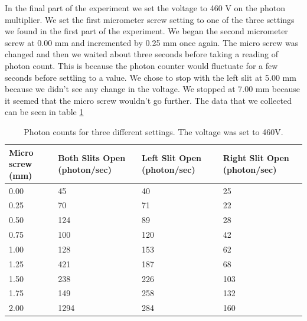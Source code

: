 \documentclass[12pt letterpaper]{article}
\begin{document}
In the final part of the experiment we set the voltage to 460 V on the photon multiplier. We set the first micrometer screw setting to one of the three settings we found in the first part of the experiment. We began the second micrometer screw at 0.00 mm and incremented by 0.25 mm once again. The micro screw was changed and then we waited about three seconds before taking a reading of photon count. This is because the photon counter would fluctuate for a few seconds before settling to a value. We chose to stop with the left slit at 5.00 mm because we didn't see any change in the voltage. We stopped at 7.00 mm because it seemed that the micro screw wouldn't go further. The data that we collected can be seen in table \ref{photon_count_slits}

\begin{table}[ht!]
\centering
\caption{Photon counts for three different settings. The voltage was set to 460V.}
\label{photon_count_slits}
\begin{tabular}{|l|p{2.5cm}|p{2.5cm}|p{2.5cm}|}
\hline
Micro screw (mm) & Both Slits Open (photon/sec) & Left Slit Open (photon/sec) & Right Slit Open (photon/sec) \\ \hline
0.00             & 45                           & 40                         & 25                          \\ \hline
0.25             & 70                           & 71                         & 22                          \\ \hline
0.50             & 124                          & 89                         & 28                          \\ \hline
0.75             & 100                          & 120                        & 42                          \\ \hline
1.00             & 128                          & 153                        & 62                          \\ \hline
1.25             & 421                          & 187                        & 68                          \\ \hline
1.50             & 238                          & 226                        & 103                         \\ \hline
1.75             & 149                          & 258                        & 132                         \\ \hline
2.00             & 1294                         & 284                        & 160                         \\ \hline

\end{tabular}
\end{table}
\end{document}
